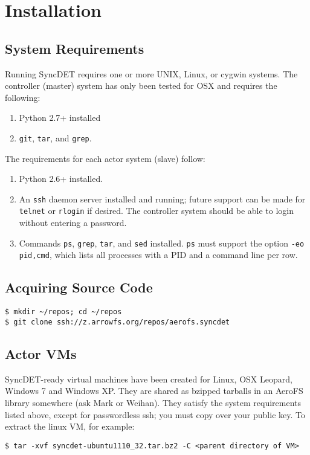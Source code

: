 \section{Installation}

\subsection{System Requirements}

Running SyncDET requires one or more UNIX, Linux, or cygwin systems. 
The controller (master) system has only been tested for OSX and requires the
following:
\begin{enumerate}
\item Python 2.7+ installed
\item {\tt git}, {\tt tar}, and {\tt grep}.
\end{enumerate}
The requirements for each actor system (slave) follow:
\begin{enumerate}
\item Python 2.6+ installed.
\item An {\tt ssh} daemon server installed and running; future support can be made for
{\tt telnet} or {\tt rlogin} if desired. The controller system should be able to login
without entering a password.
\item Commands {\tt ps}, {\tt grep}, {\tt tar}, and {\tt sed} installed. {\tt ps} must
support the option {\tt -eo pid,cmd}, which lists all processes with a PID and a
command line per row.
\end{enumerate}

\subsection{Acquiring Source Code}
\begin{verbatim}
$ mkdir ~/repos; cd ~/repos
$ git clone ssh://z.arrowfs.org/repos/aerofs.syncdet
\end{verbatim}

\subsection{Actor VMs}
SyncDET-ready virtual machines have been created for Linux, OSX Leopard, Windows
7 and Windows XP. They are shared as bzipped tarballs in an AeroFS library
somewhere (ask Mark or Weihan). They satisfy the system requirements listed
above, except for passwordless ssh; you must copy over your public key. To
extract the linux VM, for example:
\begin{verbatim}
$ tar -xvf syncdet-ubuntu1110_32.tar.bz2 -C <parent directory of VM>
\end{verbatim}

